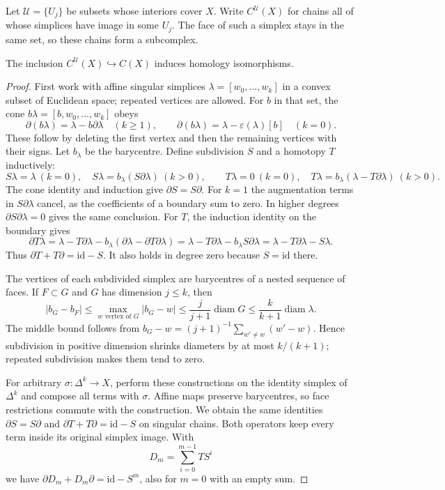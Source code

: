 Let $\mathcal U=\{U_j\}$ be subsets whose interiors cover $X$. Write $C^{\mathcal U}(X)$ for chains all of whose simplices have image in some $U_j$. The face of such a simplex stays in the same set, so these chains form a subcomplex.

\begin{theorem}\label{thm:smallchains}
The inclusion $C^{\mathcal U}(X)\hookrightarrow C(X)$ induces homology isomorphisms.
\end{theorem}

\begin{proof}
First work with affine singular simplices $\lambda=[w_0,\ldots,w_k]$ in a convex subset of Euclidean space; repeated vertices are allowed. For $b$ in that set, the cone $b\lambda=[b,w_0,\ldots,w_k]$ obeys
\[
\partial(b\lambda)=\lambda-b\partial\lambda\quad(k\ge1),\qquad
\partial(b\lambda)=\lambda-\varepsilon(\lambda)[b]\quad(k=0).
\]
These follow by deleting the first vertex and then the remaining vertices with their signs. Let $b_\lambda$ be the barycentre. Define subdivision $S$ and a homotopy $T$ inductively:
\[
S\lambda=\lambda\ (k=0),\quad S\lambda=b_\lambda(S\partial\lambda)\ (k>0),
\qquad
T\lambda=0\ (k=0),\quad T\lambda=b_\lambda(\lambda-T\partial\lambda)\ (k>0).
\]
The cone identity and induction give $\partial S=S\partial$. For $k=1$ the augmentation terms in $S\partial\lambda$ cancel, as the coefficients of a boundary sum to zero. In higher degrees $\partial S\partial\lambda=0$ gives the same conclusion. For $T$, the induction identity on the boundary gives
\[
\partial T\lambda
=\lambda-T\partial\lambda-b_\lambda(\partial\lambda-\partial T\partial\lambda)
=\lambda-T\partial\lambda-b_\lambda S\partial\lambda
=\lambda-T\partial\lambda-S\lambda.
\]
Thus $\partial T+T\partial=\mathrm{id}-S$. It also holds in degree zero because $S=\mathrm{id}$ there.

The vertices of each subdivided simplex are barycentres of a nested sequence of faces. If $F\subset G$ and $G$ has dimension $j\le k$, then
\[
|b_G-b_F|\le\max_{w\text{ vertex of }G}|b_G-w|
\le\frac{j}{j+1}\operatorname{diam}G
\le\frac{k}{k+1}\operatorname{diam}\lambda.
\]
The middle bound follows from $b_G-w=(j+1)^{-1}\sum_{w'\ne w}(w'-w)$. Hence subdivision in positive dimension shrinks diameters by at most $k/(k+1)$; repeated subdivision makes them tend to zero.

For arbitrary $\sigma:\Delta^k\to X$, perform these constructions on the identity simplex of $\Delta^k$ and compose all terms with $\sigma$. Affine maps preserve barycentres, so face restrictions commute with the construction. We obtain the same identities $\partial S=S\partial$ and $\partial T+T\partial=\mathrm{id}-S$ on singular chains. Both operators keep every term inside its original simplex image. With
\[
D_m=\sum_{i=0}^{m-1}TS^i
\]
we have $\partial D_m+D_m\partial=\mathrm{id}-S^m$, also for $m=0$ with an empty sum.


\end{proof}
